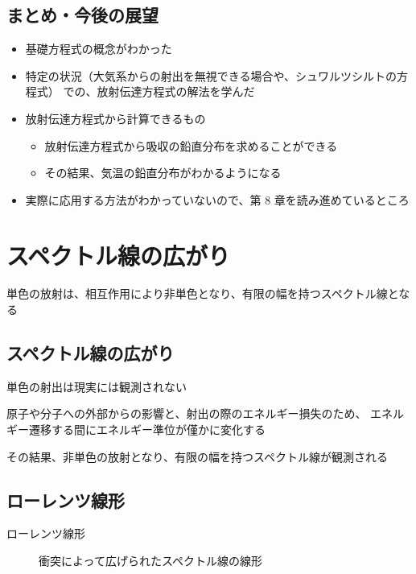 \documentclass[article]{dennou777}
\begin{document}
\subsection{まとめ・今後の展望}
\begin{itemize}
	\item 基礎方程式の概念がわかった
	\item 特定の状況（大気系からの射出を無視できる場合や、シュワルツシルトの方程式）
		での、放射伝達方程式の解法を学んだ
	\item 放射伝達方程式から計算できるもの
		\begin{itemize}
			\item 放射伝達方程式から吸収の鉛直分布を求めることができる
			\item その結果、気温の鉛直分布がわかるようになる
		\end{itemize}
	\item 実際に応用する方法がわかっていないので、第 8 章を読み進めているところ
\end{itemize}

\section{スペクトル線の広がり}
単色の放射は、相互作用により非単色となり、有限の幅を持つスペクトル線となる

\subsection{スペクトル線の広がり}
単色の射出は現実には観測されない

原子や分子への外部からの影響と、射出の際のエネルギー損失のため、
エネルギー遷移する間にエネルギー準位が僅かに変化する

その結果、非単色の放射となり、有限の幅を持つスペクトル線が観測される

\subsection{ローレンツ線形}
\begin{description}
	\item[ローレンツ線形] 衝突によって広げられたスペクトル線の線形
\end{description}
\end{document}
